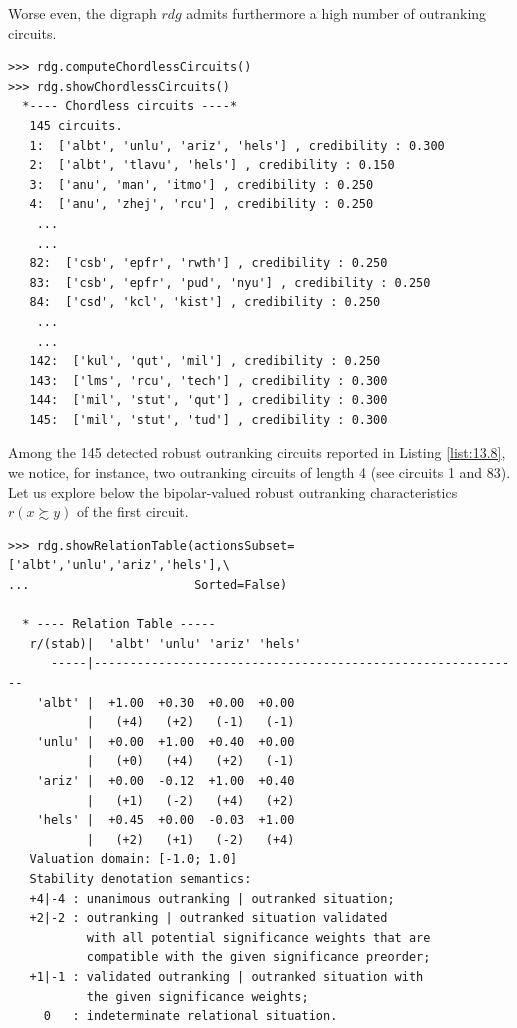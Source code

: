 Worse even, the digraph $rdg$ admits furthermore a high number of outranking circuits.

\begin{lstlisting}[caption={Inspecting outranking circuits},label=list:13.8]
>>> rdg.computeChordlessCircuits()
>>> rdg.showChordlessCircuits()
  *---- Chordless circuits ----*
   145 circuits.
   1:  ['albt', 'unlu', 'ariz', 'hels'] , credibility : 0.300
   2:  ['albt', 'tlavu', 'hels'] , credibility : 0.150
   3:  ['anu', 'man', 'itmo'] , credibility : 0.250
   4:  ['anu', 'zhej', 'rcu'] , credibility : 0.250
    ...
    ...
   82:  ['csb', 'epfr', 'rwth'] , credibility : 0.250
   83:  ['csb', 'epfr', 'pud', 'nyu'] , credibility : 0.250
   84:  ['csd', 'kcl', 'kist'] , credibility : 0.250
    ...
    ...
   142:  ['kul', 'qut', 'mil'] , credibility : 0.250
   143:  ['lms', 'rcu', 'tech'] , credibility : 0.300
   144:  ['mil', 'stut', 'qut'] , credibility : 0.300
   145:  ['mil', 'stut', 'tud'] , credibility : 0.300
\end{lstlisting}

Among the 145 detected robust outranking circuits reported in Listing \ref{list:13.8}, we notice, for instance, two outranking circuits of length 4 (see circuits 1 and 83). Let us explore below the bipolar-valued robust outranking characteristics $r(x \succsim y)$ of the first circuit.

\begin{lstlisting}[caption={Showing the relation table with stability denotation},label=list:13.9]
>>> rdg.showRelationTable(actionsSubset= ['albt','unlu','ariz','hels'],\
...                       Sorted=False) 

  * ---- Relation Table -----
   r/(stab)|  'albt' 'unlu' 'ariz' 'hels'   
      -----|------------------------------------------------------------
    'albt' |  +1.00  +0.30  +0.00  +0.00  
           |   (+4)   (+2)   (-1)   (-1)  
    'unlu' |  +0.00  +1.00  +0.40  +0.00  
           |   (+0)   (+4)   (+2)   (-1)  
    'ariz' |  +0.00  -0.12  +1.00  +0.40  
           |   (+1)   (-2)   (+4)   (+2)  
    'hels' |  +0.45  +0.00  -0.03  +1.00  
           |   (+2)   (+1)   (-2)   (+4)  
   Valuation domain: [-1.0; 1.0]
   Stability denotation semantics:
   +4|-4 : unanimous outranking | outranked situation;
   +2|-2 : outranking | outranked situation validated
           with all potential significance weights that are
           compatible with the given significance preorder;
   +1|-1 : validated outranking | outranked situation with
           the given significance weights;
     0   : indeterminate relational situation.
\end{lstlisting}

